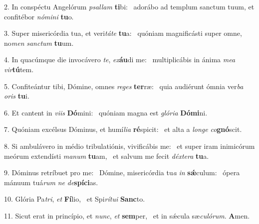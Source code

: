 2. In conspéctu Angelórum \textit{psal}\textit{lam} \textbf{ti}bi: \ast\  adorábo ad templum sanctum tuum, et confitébor \textit{nó}\textit{mi}\textit{ni} \textbf{tu}o.\

3. Super misericórdia tua, et veri\textit{tá}\textit{te} \textbf{tu}a: \ast\  quóniam magnificásti super omne, no\textit{men} \textit{sanc}\textit{tum} \textbf{tu}um.\

4. In quacúmque die invocávero \textit{te}, \textit{ex}\textbf{áu}di me: \ast\  multiplicábis in ánima \textit{me}\textit{a} \textit{vir}\textbf{tú}tem.\

5. Confiteántur tibi, Dómine, omnes \textit{re}\textit{ges} \textbf{ter}ræ: \ast\  quia audiérunt ómnia ver\textit{ba} \textit{o}\textit{ris} \textbf{tu}i.\

6. Et cantent in \textit{vi}\textit{is} \textbf{Dó}mini: \ast\  quóniam magna est \textit{gló}\textit{ri}\textit{a} \textbf{Dó}\textbf{mi}ni.\

7. Quóniam excélsus Dóminus, et humí\textit{li}\textit{a} \textbf{ré}spicit: \ast\  et alta a \textit{lon}\textit{ge} \textit{co}\textbf{gnó}scit.\

8. Si ambulávero in médio tribulatiónis, vivificábis me: \dag\  et super iram inimicórum meórum extendísti \textit{ma}\textit{num} \textbf{tu}am, \ast\  et salvum me fecit \textit{déx}\textit{te}\textit{ra} \textbf{tu}a.\

9. Dóminus retríbuet pro me: \dag\  Dómine, misericórdia tu\textit{a} \textit{in} \textbf{sǽ}culum: \ast\  ópera mánuum tuá\textit{rum} \textit{ne} \textit{de}\textbf{spí}\textbf{ci}as.\

10. Glória Pa\textit{tri}, \textit{et} \textbf{Fí}lio, \ast\  et Spi\textit{rí}\textit{tu}\textit{i} \textbf{Sanc}to.\

11. Sicut erat in princípio, et \textit{nunc}, \textit{et} \textbf{sem}per, \ast\  et in sǽcula sæ\textit{cu}\textit{ló}\textit{rum}. \textbf{A}men.\

